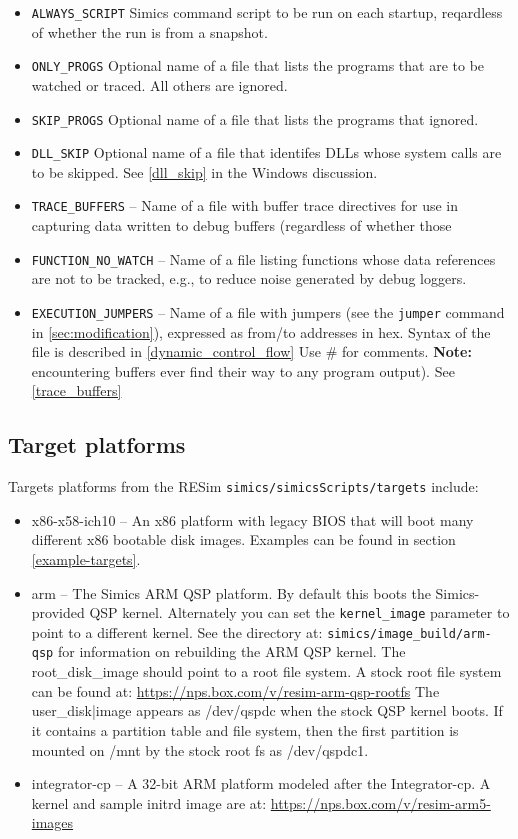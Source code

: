 \documentclass[titlepage]{article}
\begin{document}
\begin{itemize}
\item {\tt ALWAYS\_SCRIPT} Simics command script to be run on each startup, reqardless of whether the run is from a snapshot.
\item {\tt ONLY\_PROGS} Optional name of a file that lists the programs that are to be watched or traced.  All others are ignored.
\item {\tt SKIP\_PROGS} Optional name of a file that lists the programs that ignored.
\item {\tt DLL\_SKIP} Optional name of a file that identifes DLLs whose system calls are to be skipped.  See \ref{dll_skip} in the Windows discussion.
\item {\tt TRACE\_BUFFERS} -- Name of a file with buffer trace directives for use in capturing data written to debug buffers (regardless of whether those
\item {\tt FUNCTION\_NO\_WATCH} -- Name of a file listing functions whose data references are not to be tracked, e.g., to reduce noise generated by debug loggers.
\item {\tt EXECUTION\_JUMPERS} -- Name of a file with jumpers (see the {\tt jumper} command in \ref{sec:modification}), expressed as 
from/to addresses in hex.  Syntax of the file is described in \ref{dynamic_control_flow}  Use \# for comments.  \textbf{Note:} encountering
buffers ever find their way to any program output). See \ref{trace_buffers}
\end{itemize}

\subsection{Target platforms}
\label{target-platforms}
Targets platforms from the RESim {\tt simics/simicsScripts/targets} include:
\begin{itemize}
\item x86-x58-ich10 -- An x86 platform with legacy BIOS that will boot many different x86 bootable disk images. Examples can be found in
section \ref{example-targets}.
\item arm -- The Simics ARM QSP platform.  By default this boots the Simics-provided QSP kernel.  Alternately you can set the {\tt kernel\_image} 
parameter to point to a different kernel.  See the directory at:
\newline
{\tt simics/image\_build/arm-qsp} for information on rebuilding the ARM QSP kernel.  The root\_disk\_image should point to a root file system.
A stock root file system can be found at: 
\newline
\url{https://nps.box.com/v/resim-arm-qsp-rootfs}
The user\_disk|image appears as /dev/qspdc when the stock QSP kernel boots.  If it contains a partition table and file system, then the first
partition is mounted on /mnt by the stock root fs as /dev/qspdc1.

\item integrator-cp -- A 32-bit ARM platform modeled after the Integrator-cp.  A kernel and sample initrd image are at:
\newline
\url{https://nps.box.com/v/resim-arm5-images}
\end{itemize}
\end{document}
